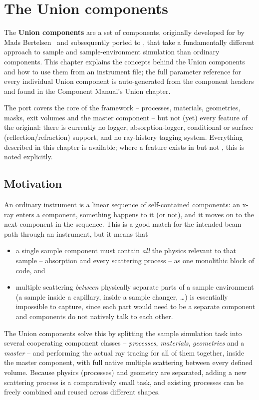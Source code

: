 \chapter{The Union components}
\label{c:union}

The \textbf{Union components} are a set of \MCX components, originally
developed for \MCS by Mads Bertelsen~\cite{union_thesis,union_paper} and
subsequently ported to \MCX, that take a fundamentally different approach
to sample and sample-environment simulation than ordinary \MCX components.
This chapter explains the concepts behind the Union components and how to
use them from an instrument file; the full parameter reference for every
individual Union component is auto-generated from the component headers
and found in the Component Manual's Union chapter.

The \MCX port covers the core of the framework -- processes, materials,
geometries, masks, exit volumes and the master component -- but not (yet)
every feature of the \MCS original: there is currently no logger,
absorption-logger, conditional or surface (reflection/refraction) support,
and no ray-history tagging system. Everything described in this chapter is
available; where a feature exists in \MCS but not \MCX, this is noted
explicitly.

\section{Motivation}
\label{sec:union-motivation}

An ordinary \MCX instrument is a linear sequence of self-contained
components: an x-ray enters a component, something happens to it (or not),
and it moves on to the next component in the sequence. This is a good
match for the intended beam path through an instrument, but it means that
\begin{itemize}
\item a single sample component must contain \emph{all} the physics
  relevant to that sample -- absorption and every scattering process -- as
  one monolithic block of code, and
\item multiple scattering \emph{between} physically separate parts of a
  sample environment (a sample inside a capillary, inside a sample changer,
  \ldots) is essentially impossible to capture, since each part would need
  to be a separate component and \MCX components do not natively talk to
  each other.
\end{itemize}
The Union components solve this by splitting the sample simulation task
into several cooperating component classes -- \emph{processes},
\emph{materials}, \emph{geometries} and a \emph{master} -- and performing
the actual ray tracing for all of them together, inside the master
component, with full native multiple scattering between every defined
volume. Because physics (processes) and geometry are separated, adding a
new scattering process is a comparatively small task, and existing
processes can be freely combined and reused across different shapes.

